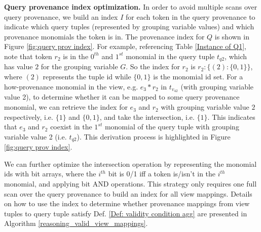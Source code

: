 \begin{example}
\textbf{Query provenance index optimization.} 
In order to avoid multiple scans over query provenance, we build an index $I$ for each token in the query provenance to indicate which query tuples (represented by grouping variable values) and which provenance monomials the token is in. The provenance index for $Q$ is shown in Figure \ref{fig:query prov index}. For example, referencing Table \ref{Instance of Q1}, note that token $r_2$ is in the $0^{th}$ and $1^{st}$ monomial in the query tuple $t_{q2}$, which has value $2$ for the grouping variable $G$. So the index for $r_2$ is $r_2:\{(2):\{0,1\}\}$, where $(2)$ represents the tuple id while $\{0,1\}$ is the monomial id set. For a how-provenance monomial in the view, e.g. $e_3*r_2$ in $t_{v_42}$ (with grouping variable value 2), to determine whether it can be mapped to some query provenance monomial, we can retrieve the index for $e_3$ and $r_2$ with grouping variable value $2$ respectively, i.e. $\{1\}$ and $\{0,1\}$, and take the intersection, i.e. $\{1\}$. This indicates that $e_3$ and $r_2$ coexist in the $1^{st}$ monomial of the query tuple with grouping variable value 2 (i.e. $t_{q2}$). 
This derivation process is highlighted in Figure \ref{fig:query prov index}.

We can further optimize the intersection operation by representing the monomial ids with bit arrays, where the $i^{th}$ bit is 0/1 iff a token is/isn't in the $i^{th}$ monomial, and applying bit AND operations. This strategy only requires one full scan over the query provenance to build an index for all view mappings. Details on how to use the index to determine whether provenance mappings from view tuples to query tuple satisfy Def. \ref{Def: validity condition agg} are presented in Algorithm \ref{reasoning_valid_view_mappings}.


\end{example}

